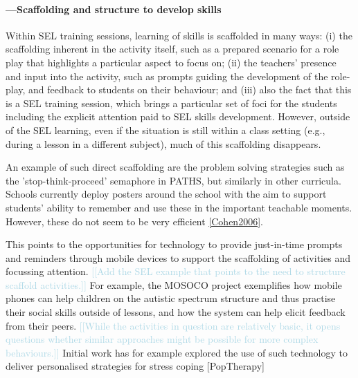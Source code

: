 \documentclass[prodmode,acmtochi]{acmsmall}
\newcommand{\todo}[1]{\textrm{\textrm{\textcolor{LightBlue}{[[#1]]} } } }
\begin{document}
\paragraph{---Scaffolding and structure to develop skills}
Within SEL training sessions, learning of skills is scaffolded in many ways:  (i) the scaffolding inherent in the activity itself, such as a prepared scenario for a role play that highlights a particular aspect to focus on; (ii) the teachers' presence and input into the activity, such as prompts guiding the development of the role-play, and feedback to students on their behaviour; and (iii) also the fact that this is a SEL training session, which brings a particular set of foci for the students including the explicit attention paid to SEL skills development. However, outside of the SEL learning, even if the situation is still within a class setting (e.g., during a lesson in a different subject), much of this scaffolding disappears. 

An example of such direct scaffolding are the problem solving strategies such as the 'stop-think-proceed' semaphore in PATHS, but similarly in other curricula. Schools currently deploy posters around the school with the aim to support students' ability to remember and use these in the important teachable moments. However, these do not seem to be very efficient \ref{Cohen2006}.

This points to the opportunities for technology to provide just-in-time prompts and reminders through mobile devices to support the scaffolding of activities  and focussing attention. 
%
\todo{Add the SEL example that points to the need to structure scaffold activities.} For example, the MOSOCO project \cite{Escobedo2012,Tentori2010} exemplifies how mobile phones can help children on the autistic spectrum structure and thus practise their social skills outside of lessons, and how the system can help elicit feedback from their peers. \todo{While the activities in question are relatively basic, it opens questions whether similar approaches might be possible for more complex behaviours.} Initial work has for example explored the use of such technology to deliver personalised strategies for stress coping [PopTherapy]
\end{document}
